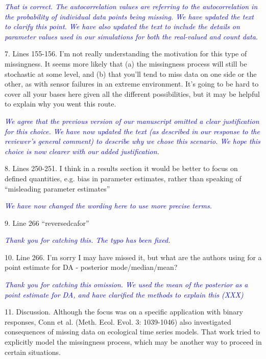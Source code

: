\documentclass{article}
\begin{document}
\begin{linenumbers}
\noindent \textcolor{blue}{\textit{That is correct. The autocorrelation values are referring to the autocorrelation in the probability of individual data points being missing. We have updated the text to clarify this point. We have also updated the text to include the details on parameter values used in our simulations for both the real-valued and count data.}} 

\bigskip

7. Lines 155-156. I’m not really understanding the motivation for this type of missingness. It seems more likely that (a) the missingness process will still be stochastic at some level, and (b) that you’ll tend to miss data on one side or the other, as with sensor failures in an extreme environment. It’s going to be hard to cover all your bases here given all the different possibilities, but it may be helpful to explain why you went this route.

\noindent \textcolor{blue}{\textit{We agree that the previous version of our manuscript omitted a clear justification for this choice. We have now updated the text (as described in our response to the reviewer's general comment) to describe why we chose this scenario. We hope this choice is now clearer with our added justification.}} 

\bigskip

8. Lines 250-251. I think in a results section it would be better to focus on defined quantities, e.g. bias in parameter estimates, rather than speaking of “misleading parameter estimates”

\noindent \textcolor{blue}{\textit{We have now changed the wording here to use more precise terms.}} 

\bigskip

9. Line 266 “reversedcafor”

\noindent \textcolor{blue}{\textit{Thank you for catching this. The typo has been fixed.}}

\bigskip

10. Line 266. I’m sorry I may have missed it, but what are the authors using for a point estimate for DA - posterior mode/median/mean?

\noindent \textcolor{blue}{\textit{Thank you for catching this omission. We used the mean of the posterior as a point estimate for DA, and have clarified the methods to explain this (XXX)}}


11. Discussion. Although the focus was on a specific application with binary responses, Conn et al. (Meth. Ecol. Evol. 3: 1039-1046) also investigated consequences of missing data on ecological time series models. That work tried to explicitly model the missingness process, which may be another way to proceed in certain situations.


\end{linenumbers}
\end{document}
